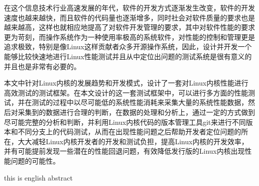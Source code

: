 




\makeatletter



\makeatother





\begin{cabstract}
在这个信息技术行业高速发展的年代，软件的开发方式逐渐发生改变，软件的开发速度也越来越快，而且软件的代码量也逐渐增多，同时社会对软件质量的要求也是越来越高，这样也就相应地提高了对软件开发管理的要求，其中对软件性能的要求更为苛刻，而操作系统作为一种使用率极高的系统软件，对性能的控制和管理更是追求极致，特别是像Linux这样贡献者众多开源操作系统，因此，设计并开发一个能够比较快速地进行Linux性能测试并且从中定位出问题的测试系统是很有意义的并且也是非常有必要的。

本文中针对Linux内核的发展趋势和开发模式，设计了一套对Linux内核性能进行高效测试的测试框架。在本文设计的这一套测试框架中，可以进行多方面的性能测试，并在测试的过程中以尽可能低的系统性能消耗来采集大量的系统性能数据，然后对采集到的数据进行合理的判断，在数据的处理和分析上，通过一定的方式做到尽可能完整的分析和判断，并利用Linux内核代码的版本管理工具git来进行不同版本和不同分支上的代码测试，从而在出现性能问题之后帮助开发者定位问题的所在，大大减轻Linux内核开发者的开发和测试负担，提高Linux内核的开发效率，并有可能提前发现一些潜在的性能回退问题，有效降低发行版的Linux内核出现性能问题的可能性。
\end{cabstract}



\begin{eabstract}
this is english abstract
\end{eabstract}

